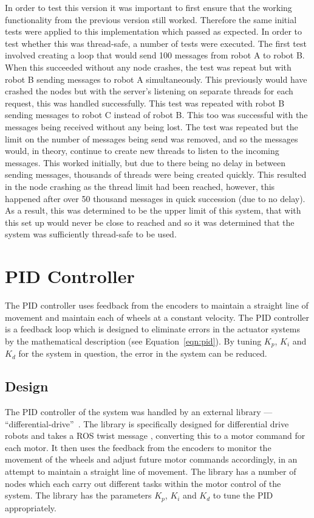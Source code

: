 In order to test this version it was important to first ensure that the
working functionality from the previous version still worked. Therefore
the same initial tests were applied to this implementation which passed
as expected. In order to test whether this was thread-safe, a number of
tests were executed. The first test involved creating a loop that would
send 100 messages from robot A to robot B. When this succeeded without any
node crashes, the test was repeat but with robot B sending messages to robot A
simultaneously. This previously would have crashed the nodes but with the
server's listening on separate threads for each request, this was handled
successfully. This test was repeated with robot B sending messages to robot C
instead of robot B. This too was successful with the messages being received
without any being lost. The test was repeated but the limit on the number of
messages being send was removed, and so the messages would, in theory,
continue to create new threads to listen to the incoming messages. This
worked initially, but due to there being no delay in between sending messages,
thousands of threads were being created quickly. This resulted in the node
crashing as the thread limit had been reached, however, this happened after
over 50 thousand messages in quick succession (due to no delay). As a result,
this was determined to be the upper limit of this system, that with this set
up would never be close to reached and so it was determined that the system
was sufficiently thread-safe to be used.

\section{PID Controller}\label{soft/PID}
The PID controller uses feedback from the encoders to maintain 
a straight line of movement and maintain each of wheels at a constant 
velocity. The PID controller is a feedback loop which is designed to 
eliminate errors in the actuator systems by the mathematical description 
(see Equation~\ref{eqn:pid}). By tuning $ K_p $, $ K_i $ and $ K_d $ for 
the system in question, the error in the system can be reduced. 

\subsection{Design}\label{soft/PID/design}
The PID controller of the system was handled by an external library --- 
``differential-drive''~\cite{diffdrivelib}. The library is specifically 
designed for differential drive robots and takes a ROS twist message
, converting this to a motor command for each 
motor. It then uses the feedback from the encoders to monitor the movement 
of the wheels and adjust future motor commands accordingly, in an attempt 
to maintain a straight line of movement. The library has a number of nodes 
which each  carry out different tasks within the motor control of the 
system. The library has the parameters $ K_p $, $ K_i $ and $ K_d $ to 
tune the PID appropriately. 

